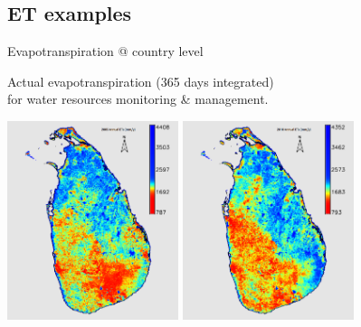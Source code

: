 \documentclass[xcolor=dvipsnames,beamer]{beamer} %
\begin{document}
\subsection{ET examples}
\begin{frame}[fragile]{Evapotranspiration @ country level}

Actual evapotranspiration (365 days integrated)\\ 
for water resources monitoring \& management.\\

\begin{center}
 \includegraphics[width=5cm]{slet2005}
 \hspace{10mm}
 \includegraphics[width=5cm]{slet2010}
\end{center}

\end{frame}
\end{document}
